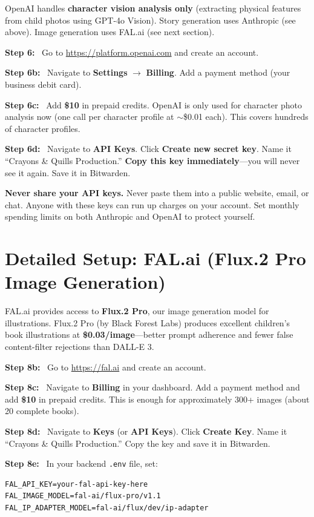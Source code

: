 \documentclass[12pt, letterpaper, oneside]{book}
\newcommand{\cost}[1]{\textcolor{money}{\textbf{#1}}}
\newcommand{\step}[1]{\noindent\textbf{\textcolor{primary}{Step #1:}}~}
\begin{document}
OpenAI handles \textbf{character vision analysis only} (extracting physical features from child photos using GPT-4o Vision). Story generation uses Anthropic (see above). Image generation uses FAL.ai (see next section).

\step{6} Go to \url{https://platform.openai.com} and create an account.

\step{6b} Navigate to \textbf{Settings} $\rightarrow$ \textbf{Billing}. Add a payment method (your business debit card).

\step{6c} Add \cost{\$10} in prepaid credits. OpenAI is only used for character photo analysis now (one call per character profile at $\sim$\$0.01 each). This covers hundreds of character profiles.

\step{6d} Navigate to \textbf{API Keys}. Click \textbf{Create new secret key}. Name it ``Crayons \& Quills Production.'' \textbf{Copy this key immediately}---you will never see it again. Save it in Bitwarden.

\begin{warningbox}
\textbf{Never share your API keys.} Never paste them into a public website, email, or chat. Anyone with these keys can run up charges on your account. Set monthly spending limits on both Anthropic and OpenAI to protect yourself.
\end{warningbox}

\section{Detailed Setup: FAL.ai (Flux.2 Pro Image Generation)}

FAL.ai provides access to \textbf{Flux.2 Pro}, our image generation model for illustrations. Flux.2 Pro (by Black Forest Labs) produces excellent children's book illustrations at \cost{\$0.03/image}---better prompt adherence and fewer false content-filter rejections than DALL-E 3.

\step{8b} Go to \url{https://fal.ai} and create an account.

\step{8c} Navigate to \textbf{Billing} in your dashboard. Add a payment method and add \cost{\$10} in prepaid credits. This is enough for approximately 300+ images (about 20 complete books).

\step{8d} Navigate to \textbf{Keys} (or \textbf{API Keys}). Click \textbf{Create Key}. Name it ``Crayons \& Quills Production.'' Copy the key and save it in Bitwarden.

\step{8e} In your backend \texttt{.env} file, set:
\begin{verbatim}
FAL_API_KEY=your-fal-api-key-here
FAL_IMAGE_MODEL=fal-ai/flux-pro/v1.1
FAL_IP_ADAPTER_MODEL=fal-ai/flux/dev/ip-adapter
\end{verbatim}
\end{document}
